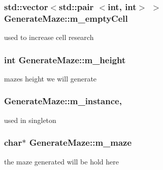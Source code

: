 \subsubsection[{m\+\_\+empty\+Cell}]{\setlength{\rightskip}{0pt plus 5cm}std\+::vector$<$std\+::pair $<$int, int$>$ $>$ Generate\+Maze\+::m\+\_\+empty\+Cell\hspace{0.3cm}{\ttfamily [private]}}\label{class_generate_maze_aa4689e1f2afaf68008f93f7ce6409882}
used to increase cell research \hypertarget{class_generate_maze_ac5c329940fd0c21779030d525884a792}{}
\subsubsection[{m\+\_\+height}]{\setlength{\rightskip}{0pt plus 5cm}int Generate\+Maze\+::m\+\_\+height\hspace{0.3cm}{\ttfamily [private]}}\label{class_generate_maze_ac5c329940fd0c21779030d525884a792}
maze\textquotesingle{}s height we will generate \hypertarget{class_generate_maze_a1d2abbee3d246f1a657934fca6916c0f}{}
\subsubsection[{m\+\_\+instance}]{ Generate\+Maze\+::m\+\_\+instance\hspace{0.3cm}{\ttfamily [static]}, {\ttfamily [private]}}\label{class_generate_maze_a1d2abbee3d246f1a657934fca6916c0f}
used in singleton \hypertarget{class_generate_maze_ac04e93698e6c2d8a3dc995eb592403e5}{}
\subsubsection[{m\+\_\+maze}]{\setlength{\rightskip}{0pt plus 5cm}char$\ast$ Generate\+Maze\+::m\+\_\+maze\hspace{0.3cm}{\ttfamily [private]}}\label{class_generate_maze_ac04e93698e6c2d8a3dc995eb592403e5}
the maze generated will be hold here \hypertarget{class_generate_maze_a0e05d9502767072ef2a613cf04cc9a20}{}
